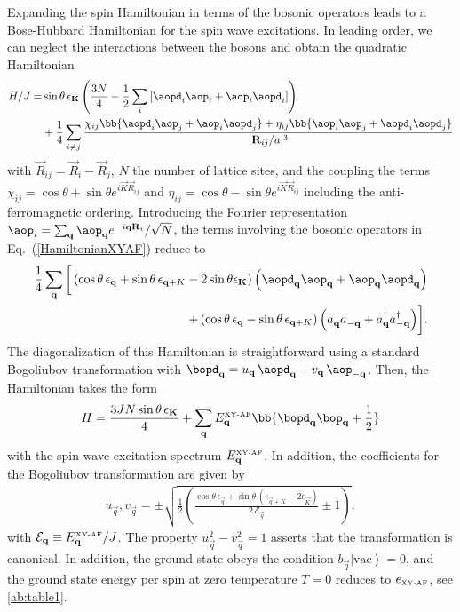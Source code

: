 Expanding the spin Hamiltonian in terms of the bosonic operators leads to a Bose-Hubbard Hamiltonian for the spin wave excitations.
In leading order, we can neglect the interactions between the bosons and obtain the quadratic Hamiltonian
%
\begin{align} \label{HamiltonianXYAF}
H/J = &\sin \theta \, \epsilon_{\vec K} \left(\frac{3 N}{4} - \frac{1}{2}\sum_i\left[\aopd_{i}\aop_i+ \aop_i \aopd_{i}\right]\right) \\
           &+  \frac{1}{4} \sum_{i\ne j} \frac{
    \chi_{i j} \bb{ \aopd_{i} \aop_{j}  + \aop_{i} \aopd_{j} }
  + \eta_{i j} \bb{ \aop_{i} \aop_{j}  + \aopd_{i} \aopd_{j} }
}{|{\vec R}_{ij}/a|^3}
\end{align}
with  ${\vec R}_{ij}={\vec R}_i - {\vec R}_j$,  $N$ the number of lattice sites, and the coupling the terms
$\chi_{i j}=\cos\theta+\sin\theta e^{i {\vec K} {\vec R}_{ij}}$ and $\eta_{i j}=\cos\theta-\sin\theta e^{i {\vec K} {\vec R}_{ij}}$ including the
 anti-ferromagnetic ordering.
Introducing the  Fourier representation $\aop_i =  \sum_{\vec q} \aop_{\vec q}e^{-i {\vec q} {\vec R}_i}/\sqrt{N}$,
the terms involving the bosonic operators in Eq.~(\ref{HamiltonianXYAF}) reduce to
%
\begin{align}
\frac{1}{4} \sum_{\vec q} \bigg[
\left( \cos\theta \, \epsilon_{\vec q} +\sin\theta \, \epsilon_{\vec q+K} - 2 \sin \theta \epsilon_{\vec K}\right)\Big(\aopd_{\vec q} \aop_{\vec q}  + \aop_{\vec q} \aopd_{\vec q}\Big) \\
+\left( \cos\theta \, \epsilon_{\vec q}-\sin\theta \, \epsilon_{\vec q+K} \right)\Big(a^{\phantom\dag}_{\vec q} a^{\phantom\dag}_{-\vec q}
+ a^{\dag}_{\vec q} a^{\dag}_{-{\vec q}} \Big) \bigg].
\end{align}
%
The diagonalization of this Hamiltonian is straightforward using a standard Bogoliubov transformation
with $\bopd_{\vec q} = u_{\vec q}\, \aopd_{\vec q} - v_{\vec q}\, \aop_{-\vec q}$.
Then, the Hamiltonian takes the form
%
\begin{align} \label{Hdiagonal}
H = \frac{3J N \sin \theta\, \epsilon_{\vec K}}{4}  + \sum_{\vec q} E^{\mbox{\tiny XY-AF}}_{\vec q} \bb{\bopd_{\vec q}\bop_{\vec q} + \frac{1}{2}}
\end{align}
%
with the spin-wave excitation spectrum $E^{\mbox{\tiny XY-AF}}_{\vec q}$. In addition, the coefficients  for the Bogoliubov transformation
are given by
%
\begin{align}
u_{\vec q} , v_{\vec q} = \pm\sqrt{\frac{1}{2} \left( \frac{\cos\theta \, \epsilon_{\vec q} +\sin\theta \, (\epsilon_{\vec q+K} - 2 \epsilon_{\vec K})}{2\, \mathcal{E}_{\vec q}}\pm 1\right)},
\end{align}
%
with $\mathcal{E}_{\vec q} \equiv E^{\mbox{\tiny XY-AF}}_{\vec q} / J $.
The property $u^2_{\vec q}-v^2_{\vec q}=1$ asserts that the transformation is canonical.
In addition, the ground state obeys the condition $b_{\vec q} \left|\text{vac}\right\rangle = 0$, and the ground state energy per spin at zero temperature $T=0$
reduces to $e_{\mbox{\tiny XY-AF}}$, see \cref{ab:table1}.

